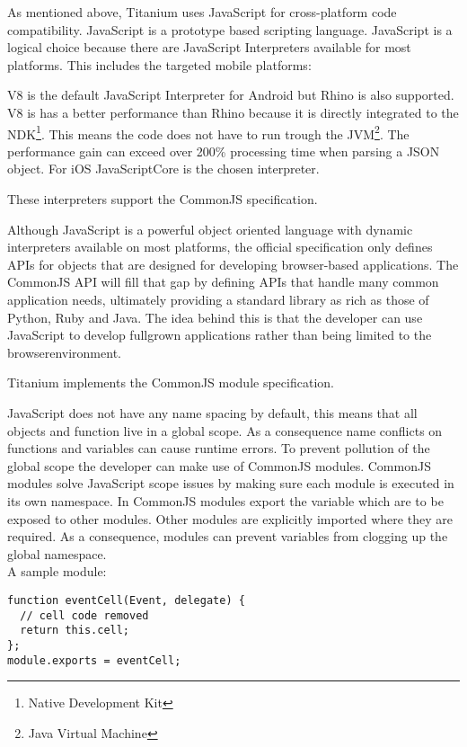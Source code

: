 As mentioned above, Titanium uses JavaScript for cross-platform code compatibility. JavaScript is a prototype based scripting language. JavaScript is a logical choice because there are JavaScript Interpreters available for most platforms. This includes the targeted mobile platforms:

V8 is the default JavaScript Interpreter for Android but Rhino is also supported. V8 is has a better performance than Rhino because it is directly integrated to the NDK\footnote{Native Development Kit}. This means the code does not have to run trough the JVM\footnote{Java Virtual Machine}. The performance gain can exceed over 200\% processing time when parsing a JSON object.\cite{Lukasavage2011}
For iOS JavaScriptCore is the chosen interpreter.

These interpreters support the CommonJS specification.


Although JavaScript is a powerful object oriented language with dynamic interpreters available on most platforms, the official specification only defines APIs for objects that are designed for developing browser-based applications.
The CommonJS API will fill that gap by defining APIs that handle many common application needs, ultimately providing a standard library as rich as those of Python, Ruby and Java.\cite{CommonJS2012a} The idea behind this is that the developer can use JavaScript to develop fullgrown applications rather than being limited to the browserenvironment.

Titanium implements the CommonJS module specification.


JavaScript does not have any name spacing by default, this means that all objects and function live in a global scope. As a consequence name conflicts on functions and variables can cause runtime errors. 
To prevent pollution of the global scope the developer can make use of CommonJS modules.
CommonJS modules solve JavaScript scope issues by making sure each module is executed in its own namespace.\cite{CommonJS2012b} In CommonJS modules export the variable which are to be exposed to other modules. Other modules are explicitly imported where they are required. As a consequence, modules can prevent variables from clogging up the global namespace.
~\\
A sample module:


\begin{verbatim}
function eventCell(Event, delegate) {
  // cell code removed
  return this.cell;
};
module.exports = eventCell;
\end{verbatim}

